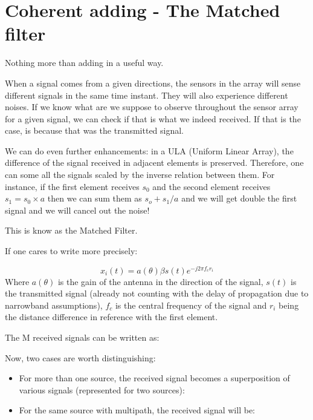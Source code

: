 \documentclass[12pt, a4paper]{article}
\begin{document}
\section{Coherent adding - The Matched filter}
\par Nothing more than adding in a useful way.
\par When a signal comes from a given directions, the sensors in the array will sense different signals in the same time instant. They will also experience different noises. If we know what are we suppose to observe throughout the sensor array for a given signal, we can check if that is what we indeed received. If that is the case, is because that was the transmitted signal.
\par We can do even further enhancements: in a ULA (Uniform Linear Array), the difference of the signal received in adjacent elements is preserved. Therefore, one can some all the signals scaled by the inverse relation between them. For instance, if the first element receives $s_0$ and the second element receives $s_1  = s_0 \times a$ then we can sum them as $s_o + s_1/a$ and we will get double the first signal and we will cancel out the noise!
\par This is know as the Matched Filter.

If one cares to write more precisely:







\begin{equation}
    x_i(t) = a(\theta) \beta s(t) e^{-j 2 \pi f_c r_i}
\end{equation}
Where $a(\theta)$ is the gain of the antenna in the direction of the signal, $s(t)$ is the transmitted signal (already not counting with the delay of propagation due to narrowband assumptions), $f_c$ is the central frequency of the signal and $r_i$ being the distance difference in reference with the first element.

\par The M received signals can be written as:


\par Now, two cases are worth distinguishing:

\begin{itemize}
    \item For more than one source, the received signal becomes a superposition of various signals (represented for two sources): 


    \item For the same source with multipath, the received signal will be:
    
\end{itemize}
\end{document}
